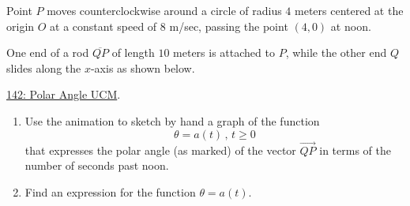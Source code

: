 \documentclass{ximera}
\begin{document}
\begin{question} \label{QOdejgERE34rd}

Point $P$ moves counterclockwise around a circle of radius $4$ meters centered at the origin $O$ at a constant speed of $8$ m/sec, passing the point $(4,0)$ at noon.


One end of a rod $\overline{QP}$ of length $10$ meters is attached to $P$, while the other end $Q$ slides along the $x$-axis as shown below. 
 
\href{https://www.desmos.com/calculator/dra9jtsynq}{142: Polar Angle UCM}.

 
\begin{onlineOnly}
    \begin{center}
\end{center}
\end{onlineOnly}


\begin{enumerate}

\item Use the animation to sketch by hand a graph of the function
\[
    \theta = a(t) \, , \, t\geq 0
\]
that expresses the polar angle (as marked) of the vector $\overrightarrow{QP}$ in terms of the number of seconds past noon.

\item Find an expression for the function $\theta = a(t)$.

\end{enumerate}
\end{question}
\end{document}
